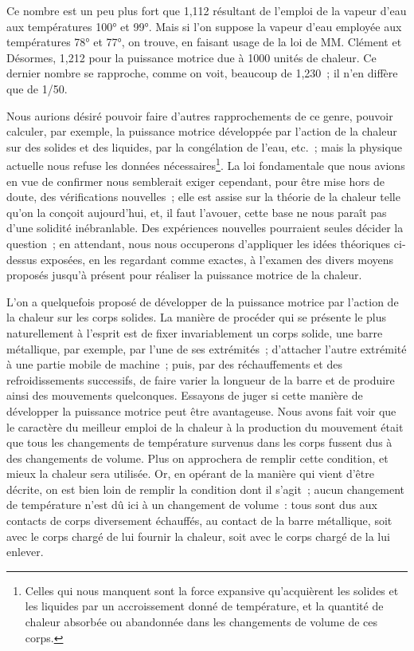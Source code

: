 \documentclass[french,twoside]{book} %
\begin{document}
\noindent Ce nombre est un peu plus fort que 1,112 résultant de l’emploi de la vapeur d’eau aux températures 100° et 99°. Mais si l’on suppose la vapeur d’eau employée aux températures 78° et 77°, on trouve, en faisant usage de la loi de MM. Clément et Désormes, 1,212 pour la puissance motrice due à 1000 unités de chaleur. Ce dernier nombre se rapproche, comme on voit, beaucoup de 1,230 ; il n’en diffère que de 1/50.\par
Nous aurions désiré pouvoir faire d’autres rapprochements de ce genre, pouvoir calculer, par exemple, la puissance motrice développée par l’action de la chaleur sur des solides et des liquides, par la congélation de l’eau, etc. ; mais la physique actuelle nous refuse les données nécessaires\footnote{Celles qui nous manquent sont la force expansive qu’acquièrent les solides et les liquides par un accroissement donné de température, et la quantité de chaleur absorbée ou abandonnée dans les changements de volume de ces corps.}. La loi fondamentale que nous avions en vue de confirmer nous semblerait exiger cependant, pour être mise hors de doute, des vérifications nouvelles ; elle est assise sur la théorie de la chaleur telle qu’on la conçoit aujourd’hui, et, il faut l’avouer, cette base ne nous paraît pas d’une solidité inébranlable. Des expériences nouvelles pourraient seules décider la question ; en attendant, nous nous occuperons d’appliquer les idées théoriques ci-dessus exposées, en les regardant comme exactes, à l’examen des divers moyens proposés jusqu’à présent pour réaliser la puissance motrice de la chaleur.\par
L’on a quelquefois proposé de développer de la puissance motrice par l’action de la chaleur sur les corps solides. La manière de procéder qui se présente le plus naturellement à l’esprit est de fixer invariablement un corps solide, une barre métallique, par exemple, par l’une de ses extrémités ; d’attacher l’autre extrémité à une partie mobile de machine ; puis, par des réchauffements et des refroidissements successifs, de faire varier la longueur de la barre et de produire ainsi des mouvements quelconques. Essayons de juger si cette manière de développer la puissance motrice peut être avantageuse. Nous avons fait voir que le caractère du meilleur emploi de la chaleur à la production du mouvement était que tous les changements de température survenus dans les corps fussent dus à des changements de volume. Plus on approchera de remplir cette condition, et mieux la chaleur sera utilisée. Or, en opérant de la manière qui vient d’être décrite, on est bien loin de remplir la condition dont il s’agit ; aucun changement de température n’est dû ici à un changement de volume : tous sont dus aux contacts de corps diversement échauffés, au contact de la barre métallique, soit avec le corps chargé de lui fournir la chaleur, soit avec le corps chargé de la lui enlever.\par
\end{document}

